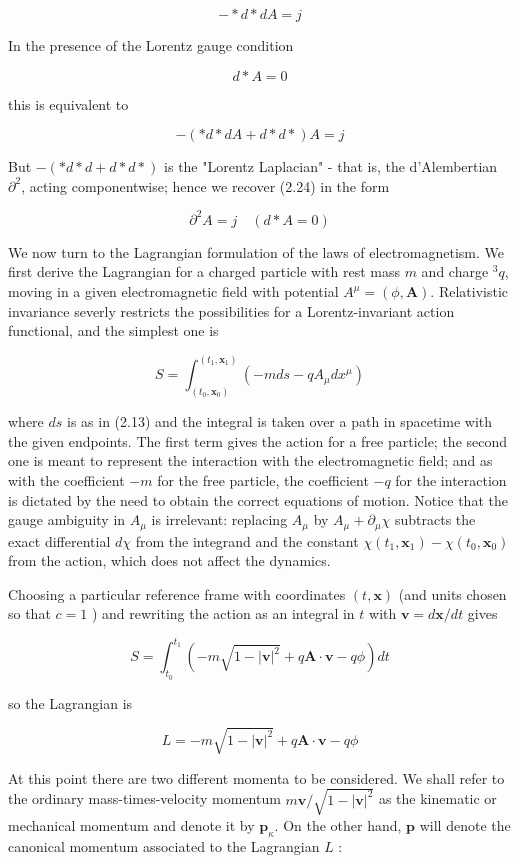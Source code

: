 \documentclass[10pt, letterpaper]{article}
\begin{document}
$$
-* d * d A=j
$$

In the presence of the Lorentz gauge condition

$$
d * A=0
$$

this is equivalent to

$$
-(* d * d A+d * d *) A=j
$$

But $-(* d * d+d * d *)$ is the "Lorentz Laplacian" - that is, the d'Alembertian $\partial^{2}$, acting componentwise; hence we recover (2.24) in the form

$$
\partial^{2} A=j \quad(d * A=0)
$$

We now turn to the Lagrangian formulation of the laws of electromagnetism. We first derive the Lagrangian for a charged particle with rest mass $m$ and charge ${ }^{3} q$, moving in a given electromagnetic field with potential $A^{\mu}=(\phi, \mathbf{A})$. Relativistic invariance severly restricts the possibilities for a Lorentz-invariant action functional, and the simplest one is

$$
S=\int_{\left(t_{0}, \mathbf{x}_{0}\right)}^{\left(t_{1}, \mathbf{x}_{1}\right)}\left(-m d s-q A_{\mu} d x^{\mu}\right)
$$

where $d s$ is as in (2.13) and the integral is taken over a path in spacetime with the given endpoints. The first term gives the action for a free particle; the second one is meant to represent the interaction with the electromagnetic field; and as with the coefficient $-m$ for the free particle, the coefficient $-q$ for the interaction is dictated by the need to obtain the correct equations of motion. Notice that the gauge ambiguity in $A_{\mu}$ is irrelevant: replacing $A_{\mu}$ by $A_{\mu}+\partial_{\mu} \chi$ subtracts the exact differential $d \chi$ from the integrand and the constant $\chi\left(t_{1}, \mathbf{x}_{1}\right)-\chi\left(t_{0}, \mathbf{x}_{0}\right)$ from the action, which does not affect the dynamics.

Choosing a particular reference frame with coordinates $(t, \mathbf{x})$ (and units chosen so that $c=1$ ) and rewriting the action as an integral in $t$ with $\mathbf{v}=d \mathbf{x} / d t$ gives

$$
S=\int_{t_{0}}^{t_{1}}\left(-m \sqrt{1-|\mathbf{v}|^{2}}+q \mathbf{A} \cdot \mathbf{v}-q \phi\right) d t
$$

so the Lagrangian is

$$
L=-m \sqrt{1-|\mathbf{v}|^{2}}+q \mathbf{A} \cdot \mathbf{v}-q \phi
$$

At this point there are two different momenta to be considered. We shall refer to the ordinary mass-times-velocity momentum $m \mathbf{v} / \sqrt{1-|\mathbf{v}|^{2}}$ as the kinematic or mechanical momentum and denote it by $\mathbf{p}_{\kappa}$. On the other hand, $\mathbf{p}$ will denote the canonical momentum associated to the Lagrangian $L$ :
\end{document}
